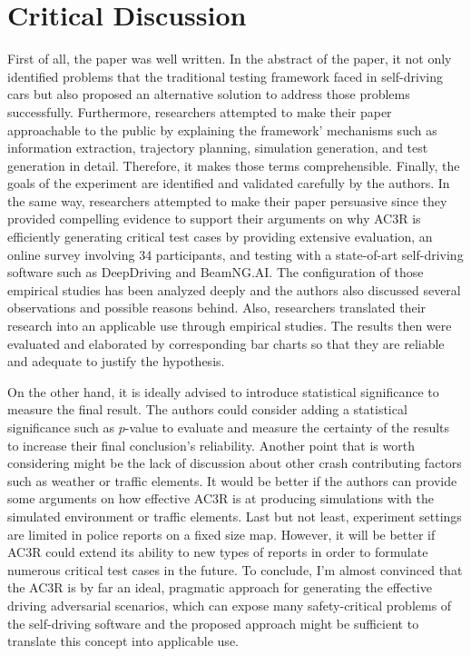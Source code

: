 \documentclass[10pt,a4paper]{report}
\begin{document}
\section{Critical Discussion}
First of all, the paper was well written. In the abstract of the paper, it not only identified problems that the traditional testing framework faced in self-driving cars but also proposed an alternative solution to address those problems successfully. 
%
Furthermore, researchers attempted to make their paper approachable to the public by explaining the framework' mechanisms such as information extraction, trajectory planning, simulation generation, and test generation in detail. Therefore, it makes those terms comprehensible. 
%
Finally, the goals of the experiment are identified and validated carefully by the authors. 
%
In the same way, researchers attempted to make their paper persuasive since they provided compelling evidence to support their arguments on why AC3R is efficiently generating critical test cases by providing extensive evaluation, an online survey involving 34 participants, and testing with a state-of-art self-driving software such as DeepDriving and BeamNG.AI.
%
The configuration of those empirical studies has been analyzed deeply and the authors also discussed several observations and possible reasons behind.
%
Also, researchers translated their research into an applicable use through empirical studies. The results then were evaluated and elaborated by corresponding bar charts so that they are reliable and adequate to justify the hypothesis.

On the other hand, it is ideally advised to introduce statistical significance to measure the final result.
%
The authors could consider adding a statistical significance such as $p$-value to evaluate and measure the certainty of the results to increase their final conclusion's reliability.
%
Another point that is worth considering might be the lack of discussion about other crash contributing factors such as weather or traffic elements.
%
It would be better if the authors can provide some arguments on how effective AC3R is at producing simulations with the simulated environment or traffic elements.
%
Last but not least, experiment settings are limited in police reports on a fixed size map.
%
However, it will be better if AC3R could extend its ability to new types of reports in order to formulate numerous critical test cases in the future.
%
To conclude, I’m almost convinced that the AC3R is by far an ideal, pragmatic approach for generating the effective driving adversarial scenarios, which can expose many safety-critical problems of the self-driving software and the proposed approach might be sufficient to translate this concept into applicable use.
\end{document}
